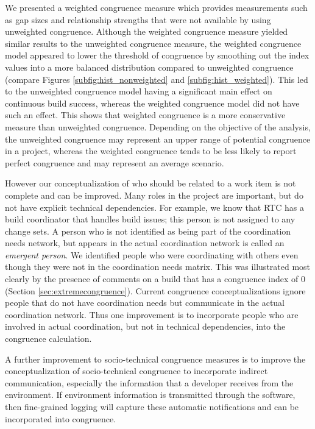 We presented a weighted congruence measure which provides measurements such as gap sizes and relationship strengths that were not available by using unweighted congruence. Although the weighted congruence measure yielded similar results to the unweighted congruence measure, the weighted congruence model appeared to lower the threshold of congruence by smoothing out the index values into a more balanced distribution compared to unweighted congruence (compare Figures \ref{subfig:hist_nonweighted} and \ref{subfig:hist_weighted}).
This led to the unweighted congruence model having a significant main effect on continuous build success, whereas the weighted congruence model did not have such an effect.
This shows that weighted congruence is a more conservative
measure than unweighted congruence. Depending on the objective of the
analysis, the unweighted congruence may represent an upper range of
potential congruence in a project, whereas the weighted congruence
tends to be less likely to report perfect congruence and may represent an average scenario.

However our conceptualization of who should be related to a work item is not complete and can be improved.
Many roles in the project are important, but do not have explicit technical dependencies.
For example, we know that RTC has a build coordinator that handles build issues; this person is not assigned to any change sets.
A person who is not identified as being part of the coordination needs network, but appears in the actual coordination network is called an \emph{emergent person}\cite{damian2007:collaboration}.
We identified people who were coordinating with others even though they were not in the coordination needs matrix.
This was illustrated most clearly by the presence of comments on a build that has a congruence index of 0 (Section \ref{sec:extremecongruence}).
Current congruence conceptualizations ignore people that do not have coordination needs but communicate in the actual coordination network.
Thus one improvement is to incorporate people who are involved in actual coordination, but not in technical dependencies, into the congruence calculation. 

A further improvement to socio-technical congruence measures is to improve the
conceptualization of socio-technical congruence to incorporate indirect
communication, especially the information that a developer receives from the
environment. If environment information is transmitted through the software, then fine-grained logging will capture these automatic notifications and can be incorporated into congruence.

